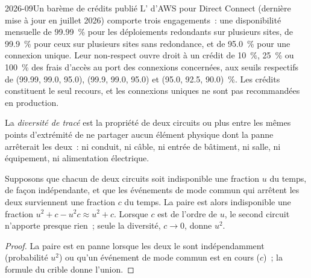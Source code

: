 \begin{dated}{2026-09}{Un barème de crédits publié}\label{dat:nw:buying-connectivity:sla}
L' d'AWS pour Direct Connect (dernière mise à jour en juillet 2026) comporte trois engagements~: une disponibilité mensuelle de 99.99~\% pour les déploiements redondants sur plusieurs sites,
de 99.9~\% pour ceux sur plusieurs sites sans redondance, et de 95.0~\% pour une connexion unique. Leur non-respect ouvre droit à un crédit de 10~\%, 25~\% ou
100~\% des frais d'accès au port des connexions concernées, aux seuils respectifs de (99.99, 99.0, 95.0), (99.9, 99.0, 95.0) et (95.0, 92.5, 90.0)~\%.
Les crédits constituent le seul recours, et les connexions uniques ne sont pas recommandées en production.
\end{dated}

\begin{definition}\label{def:nw:buying-connectivity:diversity}
La \emph{diversité de tracé} est la propriété de deux circuits ou plus entre les mêmes points d'extrémité de ne partager aucun élément physique
dont la panne arrêterait les deux~: ni conduit, ni câble, ni entrée de bâtiment, ni salle, ni équipement, ni alimentation électrique.
\end{definition}

\begin{proposition}\label{prop:nw:buying-connectivity:two}
Supposons que chacun de deux circuits soit indisponible une fraction $u$ du temps, de façon indépendante, et que les événements de mode commun qui arrêtent les deux surviennent une fraction
$c$ du temps. La paire est alors indisponible une fraction $u^2 + c - u^2 c \approx u^2 + c$. Lorsque $c$ est de l'ordre de $u$, le second circuit
n'apporte presque rien~; seule la diversité, $c \to 0$, donne $u^2$.
\end{proposition}

\begin{proof}
La paire est en panne lorsque les deux le sont indépendamment (probabilité $u^2$) ou qu'un événement de mode commun est en cours ($c$)~; la formule du crible
donne l'union.
\end{proof}

\label{lst:nw:buying-connectivity:avail}

